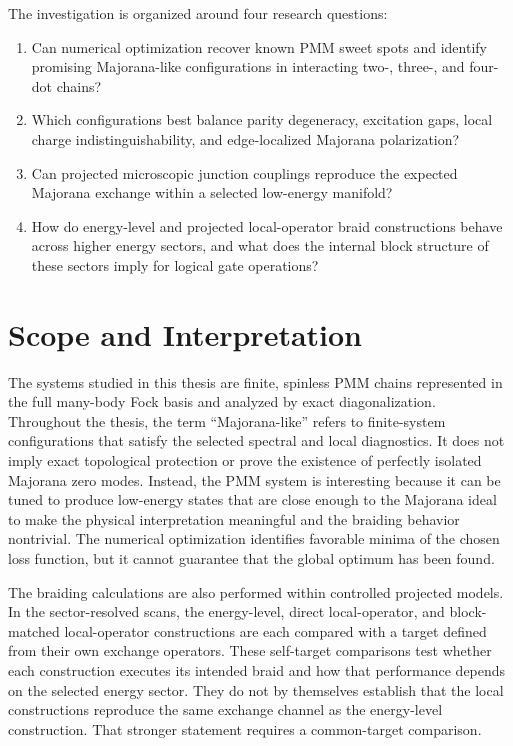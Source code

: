 The investigation is organized around four research questions:
\begin{enumerate}
  \item Can numerical optimization recover known PMM sweet spots and identify promising Majorana-like configurations in interacting two-, three-, and four-dot chains?
  \item Which configurations best balance parity degeneracy, excitation gaps, local charge indistinguishability, and edge-localized Majorana polarization?
  \item Can projected microscopic junction couplings reproduce the expected Majorana exchange within a selected low-energy manifold?
  \item How do energy-level and projected local-operator braid constructions behave across higher energy sectors, and what does the internal block structure of these sectors imply for logical gate operations?
\end{enumerate}

\section{Scope and Interpretation}

The systems studied in this thesis are finite, spinless PMM chains represented in the full many-body Fock basis and analyzed by exact diagonalization. Throughout the thesis, the term ``Majorana-like'' refers to finite-system configurations that satisfy the selected spectral and local diagnostics. It does not imply exact topological protection or prove the existence of perfectly isolated Majorana zero modes. Instead, the PMM system is interesting because it can be tuned to produce low-energy states that are close enough to the Majorana ideal to make the physical interpretation meaningful and the braiding behavior nontrivial. The numerical optimization identifies favorable minima of the chosen loss function, but it cannot guarantee that the global optimum has been found.

The braiding calculations are also performed within controlled projected models. In the sector-resolved scans, the energy-level, direct local-operator, and block-matched local-operator constructions are each compared with a target defined from their own exchange operators. These self-target comparisons test whether each construction executes its intended braid and how that performance depends on the selected energy sector. They do not by themselves establish that the local constructions reproduce the same exchange channel as the energy-level construction. That stronger statement requires a common-target comparison.

